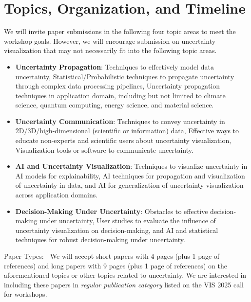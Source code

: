 \section{Topics, Organization, and Timeline}

We will invite paper submissions in the following four topic areas to meet the workshop goals. However, we will encourage submission on uncertainty visualization that may not necessarily fit into the following topic areas. 

\vspace{-6pt}
\begin{itemize}[noitemsep]
    \item 
    \textbf{Uncertainty Propagation}: Techniques to effectively model data uncertainty, Statistical/Probabilistic techniques to propagate uncertainty through complex data processing pipelines, Uncertainty propagation techniques in application domain, including but not limited to climate science, quantum computing, energy science, and material science.
    
    \item 
    \textbf{Uncertainty Communication}: Techniques to convey uncertainty in 2D/3D/high-dimensional (scientific or information) data, Effective ways to educate non-experts and scientific users about uncertainty visualization, Visualization tools or software to communicate uncertainty. 

    \item 
    \textbf{AI and Uncertainty Visualization}: Techniques to visualize uncertainty in AI models for explainability, AI techniques for propagation and visualization of uncertainty in data, and AI for generalization of uncertainty visualization across application domains.

     \item 
     \textbf{Decision-Making Under Uncertainty}: Obstacles to effective decision-making under uncertainty, User studies to evaluate the influence of uncertainty visualization on decision-making, and AI and statistical techniques for robust decision-making under uncertainty.
\end{itemize}

\vspace{-4pt}
{\large Paper Types:} $\;$ We will accept short papers with 4 pages (plus 1 page of references) and long papers with 9 pages (plus 1 page of references) on the aforementioned topics or other topics related to uncertainty. We are interested in including these papers in {\em regular publication category} listed on the VIS 2025 call for workshops.
%

